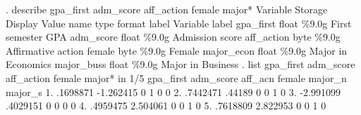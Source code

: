 . describe gpa_first adm_score aff_action female major*
{\smallskip}
Variable      Storage   Display    Value
    name         type    format    label      Variable label
gpa_first       float   \%9.0g                 First semester GPA
adm_score       float   \%9.0g                 Admission score
aff_action      byte    \%9.0g                 Affirmative action
female          byte    \%9.0g                 Female
major_econ      float   \%9.0g                 Major in Economics
major_buss      float   \%9.0g                 Major in Business
{\smallskip}
. list gpa_first adm_score aff_action female major* in 1/5
{\smallskip}
     {\TLC}
     {\VBAR} gpa_first   adm_score   aff_ac{\tytilde}n   female   major_{\tytilde}n   major_{\tytilde}s {\VBAR}
     {\LFTT}
  1. {\VBAR}  .1698871   -1.262415          0        1          0          0 {\VBAR}
  2. {\VBAR}  .7442471      .44189          0        0          1          0 {\VBAR}
  3. {\VBAR} -2.991099    .4029151          0        0          0          0 {\VBAR}
  4. {\VBAR}  .4959475    2.504061          0        0          1          0 {\VBAR}
  5. {\VBAR}  .7618809    2.822953          0        0          1          0 {\VBAR}
     {\BLC}
